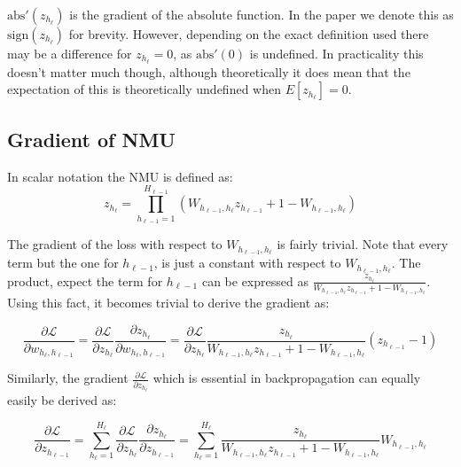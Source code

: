 $\mathrm{abs}'(z_{h_{\ell}})$ is the gradient of the absolute function. In the paper we denote this as $\mathrm{sign}(z_{h_{\ell}})$ for brevity. However, depending on the exact definition used there may be a difference for $z_{h_{\ell}} = 0$, as $\mathrm{abs}'(0)$ is undefined. In practicality this doesn't matter much though, although theoretically it does mean that the expectation of this is theoretically undefined when $E[z_{h_{\ell}}] = 0$.

\subsection{Gradient of NMU}
\label{sec:appendix:gradient-derivatives:gradient-nmu}

In scalar notation the NMU is defined as:
\begin{equation}
z_{h_\ell} = \prod_{h_{\ell-1}=1}^{H_{\ell-1}} \left(W_{h_{\ell-1},h_\ell} z_{h_{\ell-1}} + 1 - W_{h_{\ell-1},h_\ell} \right)
\end{equation}

The gradient of the loss with respect to $W_{h_{\ell-1},h_\ell}$ is fairly trivial. Note that every term but the one for $h_{\ell-1}$, is just a constant with respect to $W_{h_{\ell-1},h_\ell}$. The product, expect the term for $h_{\ell-1}$ can be expressed as $\frac{z_{h_\ell}}{W_{h_{\ell-1},h_\ell} z_{h_{\ell-1}} + 1 - W_{h_{\ell-1},h_\ell}}$. Using this fact, it becomes trivial to derive the gradient as:

\begin{equation}
\frac{\partial \mathcal{L}}{\partial w_{h_{\ell}, h_{\ell - 1}}} = \frac{\partial \mathcal{L}}{\partial z_{h_\ell}} \frac{\partial z_{h_\ell}}{\partial w_{h_{\ell}, h_{\ell - 1}}} = \frac{\partial \mathcal{L}}{\partial z_{h_\ell}} \frac{z_{h_\ell}}{W_{h_{\ell-1},h_\ell} z_{h_{\ell-1}} + 1 - W_{h_{\ell-1},h_\ell}} \left(z_{h_{\ell-1}} - 1\right)
\end{equation}

Similarly, the gradient $\frac{\partial \mathcal{L}}{\partial z_{h_\ell}}$ which is essential in backpropagation can equally easily be derived as:

\begin{equation}
\frac{\partial \mathcal{L}}{\partial z_{h_{\ell-1}}} = \sum_{h_\ell = 1}^{H_\ell} \frac{\partial \mathcal{L}}{\partial z_{h_\ell}} \frac{\partial z_{h_\ell}}{\partial z_{h_{\ell-1}}} = \sum_{h_\ell = 1}^{H_\ell} \frac{z_{h_\ell}}{W_{h_{\ell-1},h_\ell} z_{h_{\ell-1}} + 1 - W_{h_{\ell-1},h_\ell}} W_{h_{\ell-1},h_\ell}
\end{equation}
